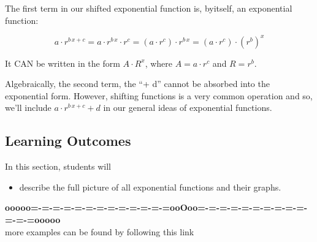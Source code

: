 \documentclass{ximera}
\begin{document}
The first term in our shifted exponential function is, byitself, an exponential function:

\[
a \cdot r^{b \, x + c} = a \cdot r^{b \, x} \cdot  r^c = (a \cdot r^c) \cdot r^{b \, x} = (a \cdot r^c) \cdot (r^b)^x 
\]

It CAN be written in the form $A \cdot R^x$, where $A = a \cdot r^c$ and $R = r^b$.


Algebraically, the second term, the ``+ d'' cannot be absorbed into the exponential form.  However, shifting functions is a very common operation and so, we'll include $a \cdot r^{b \, x + c} + d$ in our general ideas of exponential functions.





\subsection{Learning Outcomes}


\begin{sectionOutcomes}
In this section, students will 

\begin{itemize}
\item describe the full picture of all exponential functions and their graphs.
\end{itemize}
\end{sectionOutcomes}












\begin{center}
\textbf{\textcolor{green!50!black}{ooooo=-=-=-=-=-=-=-=-=-=-=-=-=ooOoo=-=-=-=-=-=-=-=-=-=-=-=-=ooooo}} \\

more examples can be found by following this link\\ 

\end{center}
\end{document}
